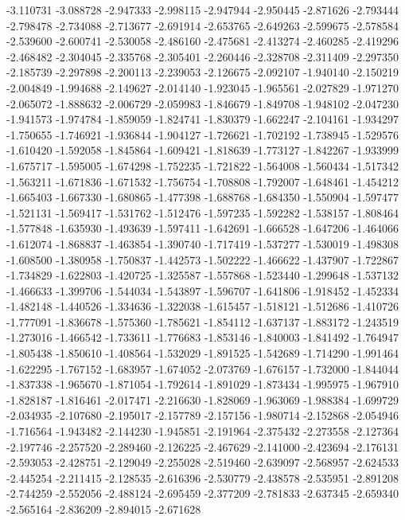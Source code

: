-3.110731
-3.088728
-2.947333
-2.998115
-2.947944
-2.950445
-2.871626
-2.793444
-2.798478
-2.734088
-2.713677
-2.691914
-2.653765
-2.649263
-2.599675
-2.578584
-2.539600
-2.600741
-2.530058
-2.486160
-2.475681
-2.413274
-2.460285
-2.419296
-2.468482
-2.304045
-2.335768
-2.305401
-2.260446
-2.328708
-2.311409
-2.297350
-2.185739
-2.297898
-2.200113
-2.239053
-2.126675
-2.092107
-1.940140
-2.150219
-2.004849
-1.994688
-2.149627
-2.014140
-1.923045
-1.965561
-2.027829
-1.971270
-2.065072
-1.888632
-2.006729
-2.059983
-1.846679
-1.849708
-1.948102
-2.047230
-1.941573
-1.974784
-1.859059
-1.824741
-1.830379
-1.662247
-2.104161
-1.934297
-1.750655
-1.746921
-1.936844
-1.904127
-1.726621
-1.702192
-1.738945
-1.529576
-1.610420
-1.592058
-1.845864
-1.609421
-1.818639
-1.773127
-1.842267
-1.933999
-1.675717
-1.595005
-1.674298
-1.752235
-1.721822
-1.564008
-1.560434
-1.517342
-1.563211
-1.671836
-1.671532
-1.756754
-1.708808
-1.792007
-1.648461
-1.454212
-1.665403
-1.667330
-1.680865
-1.477398
-1.688768
-1.684350
-1.550904
-1.597477
-1.521131
-1.569417
-1.531762
-1.512476
-1.597235
-1.592282
-1.538157
-1.808464
-1.577848
-1.635930
-1.493639
-1.597411
-1.642691
-1.666528
-1.647206
-1.464066
-1.612074
-1.868837
-1.463854
-1.390740
-1.717419
-1.537277
-1.530019
-1.498308
-1.608500
-1.380958
-1.750837
-1.442573
-1.502222
-1.466622
-1.437907
-1.722867
-1.734829
-1.622803
-1.420725
-1.325587
-1.557868
-1.523440
-1.299648
-1.537132
-1.466633
-1.399706
-1.544034
-1.543897
-1.596707
-1.641806
-1.918452
-1.452334
-1.482148
-1.440526
-1.334636
-1.322038
-1.615457
-1.518121
-1.512686
-1.410726
-1.777091
-1.836678
-1.575360
-1.785621
-1.854112
-1.637137
-1.883172
-1.243519
-1.273016
-1.466542
-1.733611
-1.776683
-1.853146
-1.840003
-1.841492
-1.764947
-1.805438
-1.850610
-1.408564
-1.532029
-1.891525
-1.542689
-1.714290
-1.991464
-1.622295
-1.767152
-1.683957
-1.674052
-2.073769
-1.676157
-1.732000
-1.844044
-1.837338
-1.965670
-1.871054
-1.792614
-1.891029
-1.873434
-1.995975
-1.967910
-1.828187
-1.816461
-2.017471
-2.216630
-1.828069
-1.963069
-1.988384
-1.699729
-2.034935
-2.107680
-2.195017
-2.157789
-2.157156
-1.980714
-2.152868
-2.054946
-1.716564
-1.943482
-2.144230
-1.945851
-2.191964
-2.375432
-2.273558
-2.127364
-2.197746
-2.257520
-2.289460
-2.126225
-2.467629
-2.141000
-2.423694
-2.176131
-2.593053
-2.428751
-2.129049
-2.255028
-2.519460
-2.639097
-2.568957
-2.624533
-2.445254
-2.211415
-2.128535
-2.616396
-2.530779
-2.438578
-2.535951
-2.891208
-2.744259
-2.552056
-2.488124
-2.695459
-2.377209
-2.781833
-2.637345
-2.659340
-2.565164
-2.836209
-2.894015
-2.671628
